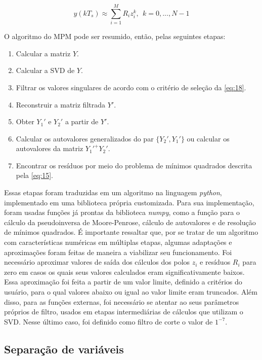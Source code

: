 \documentclass[12pt]{article}
\begin{document}
\begin{equation} \label{eq:21}
    y(kT_s) \approx \sum_{i = 1}^{M}R_i z_i^{k}, \ \ k = 0,...,N-1
\end{equation}

O algoritmo do MPM pode ser resumido, então, pelas seguintes etapas:

\begin{enumerate} \label{en:1}
    \item Calcular a matriz $Y$.
    \item Calcular a SVD de $Y$.
    \item Filtrar os valores singulares de acordo com o critério de seleção da \autoref{eq:18}.
    \item Reconstruir a matriz filtrada $Y'$.
    \item Obter $Y_1'$ e $Y_2'$ a partir de $Y'$.
    \item Calcular os autovalores generalizados do par $\{Y_2', Y_1'\}$ ou calcular os autovalores da matriz $Y_1'^+Y_2'$.
    \item Encontrar os resíduos por meio do problema de mínimos quadrados descrita pela \autoref{eq:15}.
\end{enumerate}

Essas etapas foram traduzidas em um algoritmo na linguagem \textit{python}, implementado em uma biblioteca própria customizada. Para sua implementação, 
foram usadas funções já prontas da biblioteca \textit{numpy}, como a função para o cálculo da pseudoinversa de Moore-Penrose, cálculo de autovalores e de resolução de 
mínimos quadrados. É importante ressaltar que, por se tratar de um algoritmo com características numéricas em múltiplas etapas, algumas adaptações e 
aproximações foram feitas de maneira a viabilizar seu funcionamento. Foi necessário aproximar valores de saída dos cálculos dos polos $z_i$ e resíduos 
$R_i$ para zero em casos os quais seus valores calculados eram significativamente baixos. Essa aproximação foi feita a partir de um valor limite, definido 
a critérios do usuário, para o qual valores abaixo ou igual ao valor limite eram truncados. Além disso, para as funções externas, foi necessário se atentar 
ao seus parâmetros próprios de filtro, usados em etapas intermediárias de cálculos que utilizam o SVD. Nesse último caso, foi definido como filtro de corte o 
valor de $1^{-7}$.

\subsection{Separação de variáveis}
\end{document}
